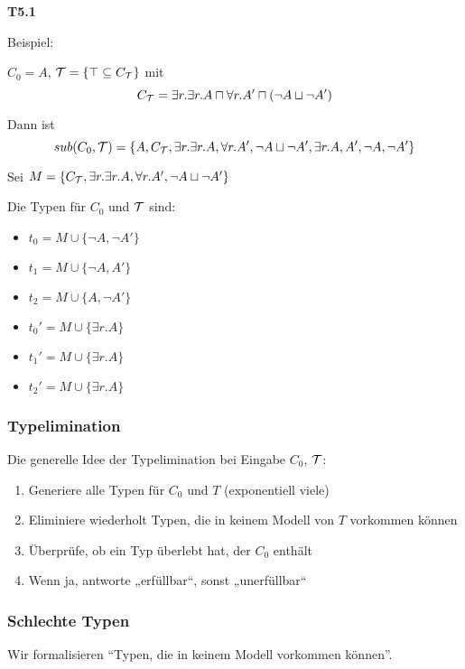 \textbf{T5.1}

Beispiel:

$C_0 = A$, $\mathcal{T} = \{\top \subseteq C_{\mathcal{T}}\}$ mit $$C_{\mathcal{T}} = \exists r.\exists r.A \sqcap \forall r.A' \sqcap (\neg A \sqcup \neg A')$$

Dann ist $$sub(C_0, \mathcal{T}) = \{A, C_{\mathcal{T}}, \exists r.\exists r.A, \forall r.A',\neg A \sqcup \neg A', \exists r.A, A', \neg A, \neg A'\}$$

Sei $M = \{C_{\mathcal{T}}, \exists r.\exists r. A, \forall r.A', \neg A \sqcup \neg A'\}$

Die Typen für $C_0$ und $\mathcal{T}$ sind:

\begin{itemize}
  \item $t_0 = M \cup \{\neg A, \neg A'\}$
  \item $t_1 = M \cup \{\neg A, A'\}$
  \item $t_2 = M \cup \{A, \neg A'\}$
  \item $t_0' = M \cup \{\exists r.A\}$
  \item $t_1' = M \cup \{\exists r.A\}$
  \item $t_2' = M \cup \{\exists r.A\}$
\end{itemize}

\subsubsection{Typelimination}\label{typelimination}

Die generelle Idee der Typelimination bei Eingabe $C_0$, $\mathcal{T}$:

\begin{enumerate}
\def\labelenumi{\arabic{enumi}.}
\item
  Generiere alle Typen für $C_{0}$ und $T$ (exponentiell viele)
\item
  Eliminiere wiederholt Typen, die in keinem Modell von $T$ vorkommen
  können
\item
  Überprüfe, ob ein Typ überlebt hat, der $C_{0}$ enthält
\item
  Wenn ja, antworte „erfüllbar``, sonst „unerfüllbar``
\end{enumerate}

\subsubsection{Schlechte Typen}\label{schlechter-typ}

Wir formalisieren \enquote{Typen, die in keinem Modell vorkommen können}.

